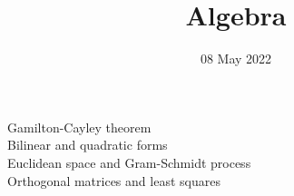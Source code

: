
\title{Algebra}
\author{}
\date{08 May 2022}

\maketitle

\begin{description}
    \item[Gamilton-Cayley theorem] 
    \item[Bilinear and quadratic forms]  
    \item[Euclidean space and Gram-Schmidt process] 
    \item[Orthogonal matrices and least squares] 
\end{description}

